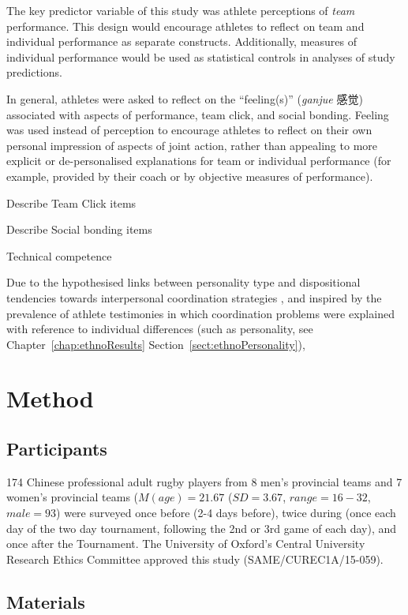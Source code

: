 \begin{CJK}{UTF8}{gbsn}
The key predictor variable of this study was athlete perceptions of \textit{team} performance. This design would encourage athletes to reflect on team and individual performance as separate constructs. Additionally, measures of individual performance would be used as statistical controls in analyses of study predictions.

In general, athletes were asked to reflect on the ``feeling(s)'' (\textit{ganjue} 感觉) associated with aspects of performance, team click, and social bonding.  Feeling was used instead of perception to encourage athletes to reflect on their own personal impression of aspects of joint action, rather than appealing to more explicit or de-personalised explanations for team or individual performance (for example, provided by their coach or by objective measures of performance).

Describe Team Click items

Describe Social bonding items

Technical competence 

Due to the hypothesised links between personality type and dispositional tendencies towards interpersonal coordination strategies \citep[e.g.][]{Richards2007,Marsh2009,Sevdalis2014}, and inspired by the prevalence of athlete testimonies in which coordination problems were explained with reference to individual differences (such as personality, see Chapter~\ref{chap:ethnoResults} Section~\ref{sect:ethnoPersonality}),





\clearpage

\section{Method}
\subsection{Participants}
174 Chinese professional adult rugby players from 8 men’s provincial teams and 7 women’s provincial teams ($M(age) = 21.67$ ($SD = 3.67$, $range = 16 - 32$, $male = 93$) were surveyed once before (2-4 days before), twice during (once each day of the two day tournament, following the 2nd or 3rd game of each day), and once after the Tournament.  The University of Oxford’s Central University Research Ethics Committee approved this study (SAME/CUREC1A/15-059).

\subsection{Materials}


\end{CJK}
